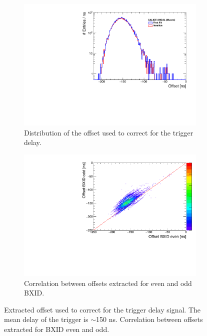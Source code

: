 \begin{figure}[t]
	\begin{subfigure}[t]{0.45\textwidth}
		\centering
		\includegraphics[width=1\textwidth]{chap5/fig_AHCAL_timing/Muons/ExtractedOffsets.pdf}
		\caption{Distribution of the offset used to correct for the trigger delay.}\label{fig:offset_trigger_distribution}
	\end{subfigure}
	\hfill
	\begin{subfigure}[t]{0.45\textwidth}
		\centering
		\includegraphics[width=1\textwidth]{chap5/fig_AHCAL_timing/Muons/CorrelationOffsets_BXID.pdf}
		\caption{Correlation between offsets extracted for even and odd BXID.}\label{fig:BXID_offset}
	\end{subfigure}
	\caption{ Extracted offset used to correct for the trigger delay signal. The mean delay of the trigger is $\sim$150 ns.  Correlation between offsets extracted for BXID even and odd.}
\end{figure}

